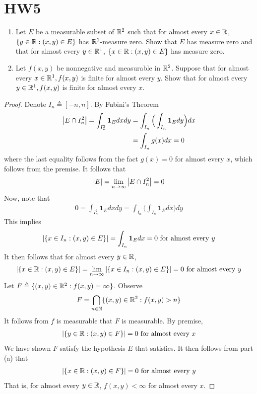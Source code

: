 \documentclass{report}
\begin{document}
\section{HW5}
\begin{question}{}{}
\begin{enumerate}[label=(\alph*)]
  \item Let $E$ be a measurable subset of $\mathbb{R}^2$ such that for almost every  $x\in\mathbb{R}$, $\{ y\in\mathbb{R} : (x,y)\in E \}$ has $\mathbb{R}^1$-measure zero. Show that  $E$ has measure zero and that for almost every  $y\in\mathbb{R}^1$, $\{ x\in\mathbb{R}:(x,y)\in E \}$ has measure zero.  
  \item Let $f(x,y)$ be nonnegative and measurable in $\mathbb{R}^2$. Suppose that for almost every  $x\in\mathbb{R}^1,f(x,y)$ is finite for almost every $y$.  Show that for almost every $y\in\mathbb{R}^1,f(x,y)$ is finite for almost every $x$. 
\end{enumerate}
\end{question}
\begin{proof}
Denote $I_n \triangleq [-n,n]$. By Fubini's Theorem 
\begin{align*}
\left|E\cap I_n^2\right|=\int_{I_n^2}\textbf{1}_E dxdy&=\int_{I_n} \Big( \int_{I_n} \textbf{1}_E dy \Big) dx  \\
&=\int_{I_n} g(x)dx=0 
\end{align*}
where the last equality follows from the fact  $g(x)=0$ for almost every $x$, which follows from the premise. It follows that 
\begin{align*}
\left|E\right|=\lim_{n\to \infty} \left|E\cap I_n^2\right|=0
\end{align*}
Now, note that 
\begin{align*}
0=\int_{I_n^2}\textbf{1}_E dxdy= \int_{I_n} \Big( \int_{I_n}\textbf{1}_E dx \Big) dy
\end{align*}
This implies 
\begin{align*}
\left|\{ x \in I_n: (x,y) \in E  \}\right|=\int_{I_n}\textbf{1}_E dx=0 \text{ for almost every }y
\end{align*}
It then follows that for almost every $y\in\mathbb{R}$, 
\begin{align*}
\left|\{ x \in\mathbb{R}: (x,y)\in E \}\right|= \lim_{n\to \infty} \left|\{ x \in I_n:(x,y) \in E \}\right|= 0\text{ for almost every }y
\end{align*}
Let $F\triangleq \{ (x,y)\in\mathbb{R}^2: f(x,y)=\infty \}$. Observe 
\begin{align*}
F= \bigcap_{n\in\mathbb{N}} \{ (x,y)\in\mathbb{R}^2:f(x,y)>n \}
\end{align*}
It follows from $f$ is measurable that $F$ is  measurable. By premise, 
\begin{align*}
\left|\{ y\in\mathbb{R}: (x,y)\in F \}\right|=0\text{ for almost every }x 
\end{align*}
We have shown $F$ satisfy the hypothesis $E$ that satisfies. It then follows from part (a) that 
\begin{align*}
  \left|\{ x\in\mathbb{R}: (x,y)\in F \}\right|=0\text{ for almost every }y
\end{align*}
That is, for almost every $y\in\mathbb{R}$, $f(x,y)<\infty$ for almost every $x$. 
\end{proof}
\end{document}
